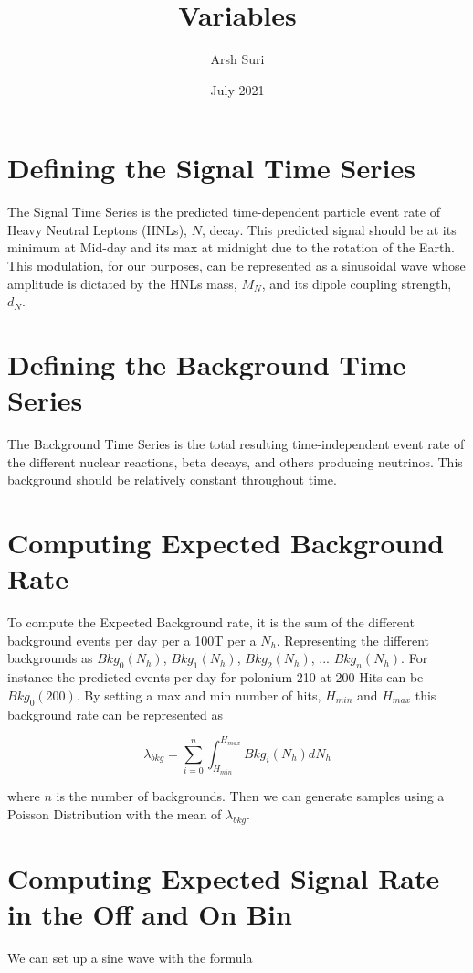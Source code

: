 \documentclass{article}
\title{Variables}
\author{Arsh Suri}
\date{July 2021}
\begin{document}
\maketitle

\section{Defining the Signal Time Series}
The Signal Time Series is the predicted time-dependent particle event rate of 
Heavy Neutral Leptons (HNLs), $N$, decay. This predicted signal should be at its minimum at Mid-day and its max at midnight due to the rotation of the Earth. This modulation, for our purposes, 
can be represented as a sinusoidal wave whose amplitude is dictated by the HNLs mass, $M_{N}$, 
and its dipole coupling strength, $d_{N}$.

\section{Defining the Background Time Series}
The Background Time Series is the total resulting time-independent event rate of the different nuclear reactions, beta decays, and others producing neutrinos. This background should be relatively constant throughout time.  

\section{Computing Expected Background Rate}
To compute the Expected Background rate, it is the sum of the different background events per
day per a 100T per a $N_{h}$. Representing the different backgrounds as $Bkg_{0}(N_{h})$, 
$Bkg_{1}(N_{h})$, $Bkg_{2}(N_{h})$, ... $Bkg_{n}(N_{h})$. For instance the predicted events per day for polonium 210 at 200 Hits can be $Bkg_{0}(200)$. By setting a max and min number of hits, $H_{min}$ and 
$H_{max}$ this background rate can be represented as

\begin{equation}
   \lambda_{bkg} = \sum_{i=0}^{n} \int_{H_{min}}^{H_{max}} Bkg_{i}(N_{h}) dN_{h}
\end{equation}

where $n$ is the number of backgrounds. Then we can generate samples using a Poisson Distribution with the mean of $\lambda_{bkg}$.

\section{Computing Expected Signal Rate in the Off and On Bin}
We can set up a sine wave with the formula
\end{document}
